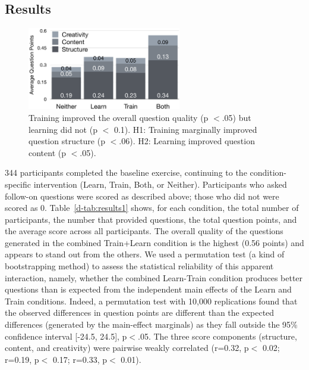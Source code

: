 \subsection*{Results}

\begin{figure}[h]
  \centering
  \includegraphics[width=0.6\textwidth]{figures/docent/fig-5.png}
  \caption[Training improved the overall question quality but learning did not]
{Training improved the overall question quality (p $<$.05) but learning did not (p $<$ 0.1). H1: Training marginally improved question structure (p $<$.06). H2: Learning improved question content (p $<$.05).}
  \label{fig:docent-5}
\end{figure}


344 participants completed the baseline exercise, continuing to the condition-specific intervention (Learn, Train, Both, or Neither). Participants who asked follow-on questions were scored as described above; those who did not were scored as 0. Table~\ref{d-tab:results1} shows, for each condition, the total number of participants, the number that provided questions, the total question points, and the average score across all participants. The overall quality of the questions generated in the combined Train+Learn condition is the highest (0.56 points) and appears to stand out from the others. We used a permutation test (a kind of bootstrapping method) to assess the statistical reliability of this apparent interaction, namely, whether the combined Learn-Train condition produces better questions than is expected from the independent main effects of the Learn and Train conditions. Indeed, a permutation test with 10,000 replications found that the observed differences in question points are different than the expected differences (generated by the main-effect marginals) as they fall outside the 95\% confidence interval [-24.5, 24.5], p$ <$.05. The three score components (structure, content, and creativity) were pairwise weakly correlated (r=0.32, p$ <$ 0.02; r=0.19, p$ <$ 0.17; r=0.33, p$ <$ 0.01). 

